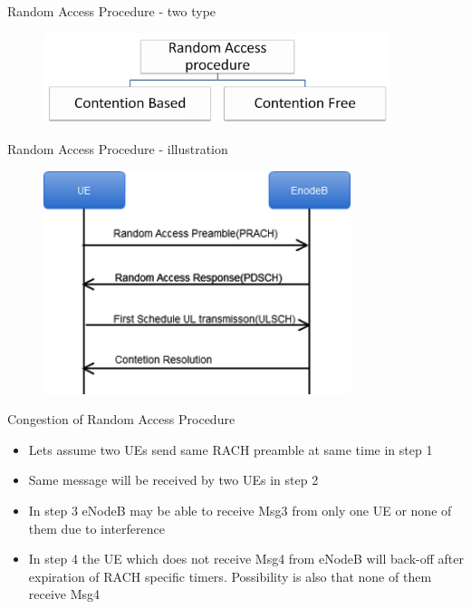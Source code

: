 \documentclass{beamer}
\begin{document}
\begin{frame}{Random Access Procedure - two type}
    \begin{figure}[t]
        \centering
        \includegraphics[width=0.9\textwidth]{figures/content.png}
    \end{figure}
\end{frame}
\begin{frame}{Random Access Procedure - illustration}
    \begin{figure}[t]
        \centering
        \includegraphics[width=0.8\textwidth]{figures/rap.png}
    \end{figure}
\end{frame}

\begin{frame}{Congestion of Random Access Procedure}
    \begin{itemize}
        \item {Lets assume two UEs send same RACH preamble at same time in step 1}
        \item {Same message will be received by two UEs in step 2}
        \item {In step 3 eNodeB may be able to receive Msg3 from only one UE or none of them due to interference}
        \item {In step 4 the UE which does not receive Msg4 from eNodeB will back-off after expiration of RACH specific timers. Possibility is also that none of them receive Msg4}

    \end{itemize}
\end{frame}
\end{document}

